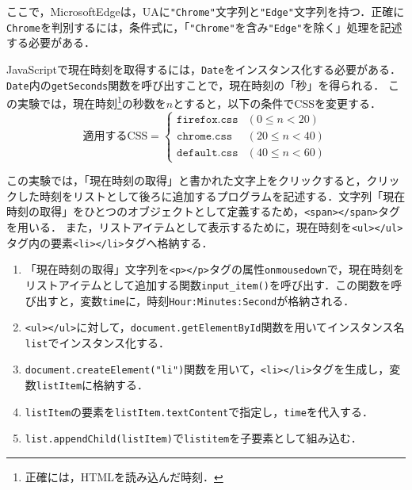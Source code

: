 ここで，MicrosoftEdgeは，UAに\texttt{"Chrome"}文字列と\texttt{"Edge"}文字列を持つ．正確に\texttt{Chrome}を判別するには，条件式に，「\texttt{"Chrome"}を含み\texttt{"Edge"}を除く」処理を記述する必要がある．\\
\par
JavaScriptで現在時刻を取得するには，\texttt{Date}をインスタンス化する必要がある．\texttt{Date}内の\texttt{getSeconds}関数を呼び出すことで，現在時刻の「秒」を得られる．
この実験では，現在時刻\footnote{正確には，HTMLを読み込んだ時刻．}の秒数を\(n\)とすると，以下の条件でCSSを変更する．
\begin{equation*}
    \textrm{適用するCSS}=
    \begin{cases}
        \texttt{firefox.css} & (0\leq n<20)  \\
        \texttt{chrome.css}  & (20\leq n<40) \\
        \texttt{default.css} & (40\leq n<60)
    \end{cases}
\end{equation*}
\par
この実験では，「現在時刻の取得」と書かれた文字上をクリックすると，クリックした時刻をリストとして後ろに追加するプログラムを記述する．文字列「現在時刻の取得」をひとつのオブジェクトとして定義するため，\texttt{<span></span>}タグを用いる．
また，リストアイテムとして表示するために，現在時刻を\texttt{<ul></ul>}タグ内の要素\texttt{<li></li>}タグへ格納する．\par
\begin{enumerate}
    \item 「現在時刻の取得」文字列を\texttt{<p></p>}タグの属性\texttt{onmousedown}で，現在時刻をリストアイテムとして追加する関数\texttt{input\_item()}を呼び出す．この関数を呼び出すと，変数\texttt{time}に，時刻\texttt{Hour:Minutes:Second}が格納される．
    \item \texttt{<ul></ul>}に対して，\texttt{document.getElementById}関数を用いてインスタンス名\texttt{list}でインスタンス化する．
    \item \texttt{document.createElement("li")}関数を用いて，\texttt{<li></li>}タグを生成し，変数\texttt{listItem}に格納する．
    \item \texttt{listItem}の要素を\texttt{listItem.textContent}で指定し，\texttt{time}を代入する．
    \item \texttt{list.appendChild(listItem)}で\texttt{listitem}を子要素として組み込む．
\end{enumerate}
